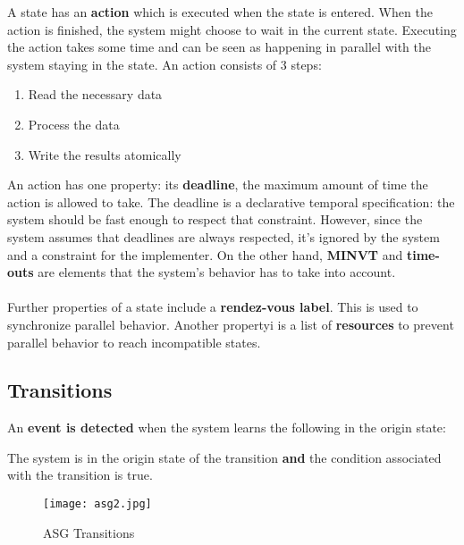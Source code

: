 \documentclass[../main.tex]{subfiles}
\begin{document}
A state has an \textbf{action} which is executed when the state is entered. When the action is finished, the system might choose to wait in the current state.  Executing the action takes some time and can be seen as happening in parallel with the system staying in the state. An action consists of 3 steps:
\begin{enumerate}
	\item Read the necessary data
	\item Process the data
	\item Write the results atomically
\end{enumerate}
An action has one property: its \textbf{deadline}, the maximum amount of time the action is allowed to take. The deadline is a declarative temporal specification: the system should be fast enough to respect that constraint. However, since the system assumes that deadlines are always respected, it's ignored by the system and a constraint for the implementer. On the other hand, \textbf{MINVT} and \textbf{time-outs} are elements that the system's behavior has to take into account.
\\\\
Further properties of a state include a \textbf{rendez-vous label}. This is used to synchronize parallel behavior. Another propertyi is a list of \textbf{resources} to prevent parallel behavior to reach incompatible states.

\subsection{Transitions}
\begin{defn}
An \textbf{event is detected} when the system learns the following in the origin state:
\begin{center}
The system is in the origin state of the transition \textbf{and} the condition associated with the transition is true.
\end{center}
\end{defn}

\begin{figure}[H]
    \centering
    \texttt{[image: asg2.jpg]}
    \caption{ASG Transitions}
    \label{asg2}
\end{figure}
\end{document}
